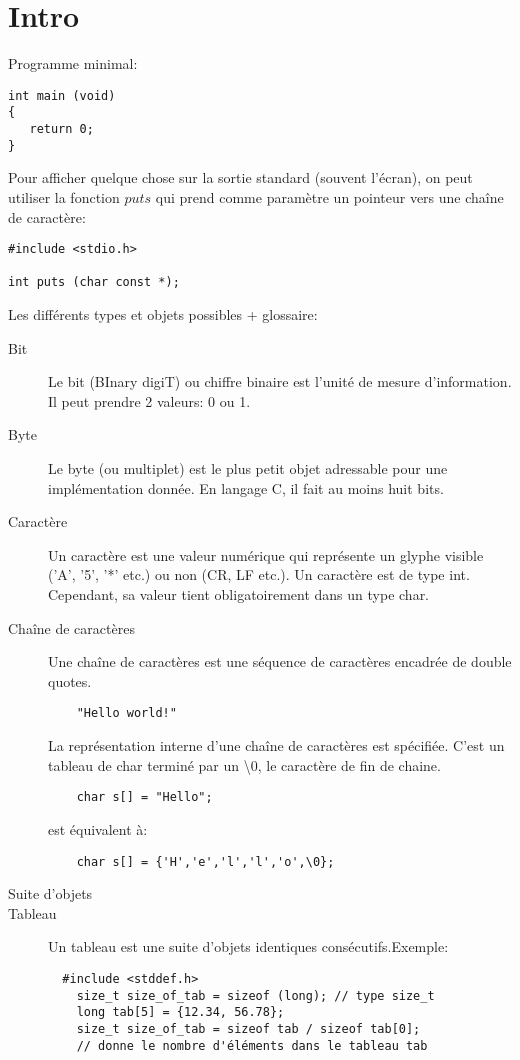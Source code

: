 \documentclass[a4paper]{article}
\begin{document}
\section{Intro}
Programme minimal:
\begin{lstlisting}
int main (void)
{
   return 0;
}
\end{lstlisting}
Pour afficher quelque chose sur la sortie standard (souvent l'écran), on peut utiliser la fonction $puts$ qui prend comme paramètre un pointeur vers une chaîne de caractère:
\begin{lstlisting}
#include <stdio.h>

int puts (char const *);
\end{lstlisting}
Les différents types et objets possibles + glossaire:
\begin{description}
  \item [Bit] Le bit (BInary digiT) ou chiffre binaire est l'unité de mesure d'information. Il peut prendre 2 valeurs: 0 ou 1.
  \item [Byte] Le byte (ou multiplet) est le plus petit objet adressable pour une implémentation donnée. En langage C, il fait au moins huit bits.
  \item [Caractère] Un caractère est une valeur numérique qui représente un glyphe visible ('A', '5', '*' etc.) ou non (CR, LF etc.). Un caractère est de type int. Cependant, sa valeur tient obligatoirement dans un type char.
  \item [Chaîne de caractères] Une chaîne de caractères est une séquence de caractères encadrée de double quotes. \newline
  \begin{lstlisting}
    "Hello world!"
  \end{lstlisting}
  La représentation interne d'une chaîne de caractères est spécifiée. C'est un tableau de char terminé par un \guillemotleft{}\textbackslash0\guillemotright{}, le caractère de fin de chaine.
  \begin{lstlisting}
    char s[] = "Hello";
  \end{lstlisting}

  est équivalent à:
  \begin{lstlisting}
    char s[] = {'H','e','l','l','o',\0};
  \end{lstlisting}
  \item [\guillemotleft{}Suite d'objets\guillemotright{}]
  \item [Tableau] Un tableau est une suite d'objets identiques consécutifs.\newline Exemple:
  \begin{lstlisting}
  #include <stddef.h>
    size_t size_of_tab = sizeof (long); // type size_t
    long tab[5] = {12.34, 56.78};
    size_t size_of_tab = sizeof tab / sizeof tab[0];
    // donne le nombre d'éléments dans le tableau tab
  \end{lstlisting}


\end{description}
\end{document}
